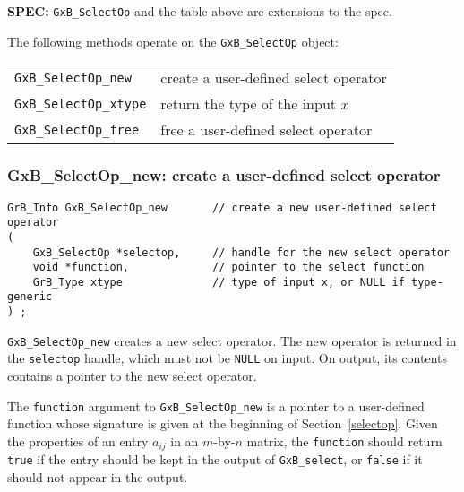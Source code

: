 \documentclass[12pt]{article}
\begin{document}
\begin{spec}
{\bf SPEC:} \verb'GxB_SelectOp' and the table above
are extensions to the spec.
\end{spec}

The following methods operate on the \verb'GxB_SelectOp' object:

\vspace{0.1in}
{\footnotesize
\begin{tabular}{ll}
\hline
\verb'GxB_SelectOp_new'   & create a user-defined select operator  \\
\verb'GxB_SelectOp_xtype' & return the type of the input $x$ \\
\verb'GxB_SelectOp_free'  & free a user-defined select operator  \\
\hline
\end{tabular}
}
\vspace{0.1in}

\subsubsection{{\sf GxB\_SelectOp\_new:} create a user-defined select operator}
\label{selectop_new}

\begin{mdframed}[userdefinedwidth=6in]
{\footnotesize
\begin{verbatim}
GrB_Info GxB_SelectOp_new       // create a new user-defined select operator
(
    GxB_SelectOp *selectop,     // handle for the new select operator
    void *function,             // pointer to the select function
    GrB_Type xtype              // type of input x, or NULL if type-generic
) ;
\end{verbatim} }\end{mdframed}

\verb'GxB_SelectOp_new' creates a new select operator.  The new operator is
returned in the \verb'selectop' handle, which must not be \verb'NULL' on input.
On output, its contents contains a pointer to the new select operator.

The \verb'function' argument to \verb'GxB_SelectOp_new' is a pointer to a
user-defined function whose signature is given at the beginning of
Section~\ref{selectop}.  Given the properties of an entry $a_{ij}$ in an
$m$-by-$n$ matrix, the \verb'function' should return \verb'true' if the entry
should be kept in the output of \verb'GxB_select', or \verb'false' if it should
not appear in the output.
\end{document}
